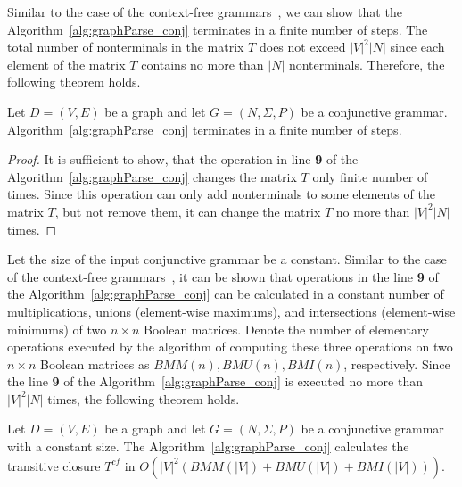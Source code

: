 Similar to the case of the context-free grammars~\cite{azimov2018context}, we can show that the Algorithm~\ref{alg:graphParse_conj} terminates in a finite number of steps. The total number of nonterminals in the matrix $T$ does not exceed $|V|^2|N|$ since each element of the matrix $T$ contains no more than $|N|$ nonterminals. Therefore, the following theorem holds.

\begin{mytheorem}\label{thm:finite_conj}
    Let $D = (V,E)$ be a graph and let $G =(N,\Sigma,P)$ be a conjunctive grammar. Algorithm~\ref{alg:graphParse_conj} terminates in a finite number of steps. 
\end{mytheorem}
\begin{proof}
    It is sufficient to show, that the operation in line \textbf{9} of the Algorithm~\ref{alg:graphParse_conj} changes the matrix $T$ only finite number of times. Since this operation can only add nonterminals to some elements of the matrix $T$, but not remove them, it can change the matrix $T$ no more than $|V|^2|N|$ times.
\end{proof}

Let the size of the input conjunctive grammar be a constant. Similar to the case of the context-free grammars~\cite{azimov2018context}, it can be shown that operations in the line \textbf{9} of the Algorithm~\ref{alg:graphParse_conj} can be calculated in a constant number of multiplications, unions (element-wise maximums), and intersections (element-wise minimums) of two $n \times n$ Boolean matrices. Denote the number of elementary operations executed by the algorithm of computing these three operations on two $n \times n$ Boolean matrices as $BMM(n), BMU(n), BMI(n)$, respectively. Since the line \textbf{9} of the Algorithm~\ref{alg:graphParse_conj} is executed no more than $|V|^2|N|$ times, the following theorem holds.

\begin{mytheorem}\label{thm:time_conj}
    Let $D = (V,E)$ be a graph and let $G =(N,\Sigma,P)$ be a conjunctive grammar with a constant size. The Algorithm~\ref{alg:graphParse_conj} calculates the transitive closure $T^{cf}$ in $O(|V|^2(BMM(|V|) + BMU(|V|) + BMI(|V|)))$.
\end{mytheorem}

